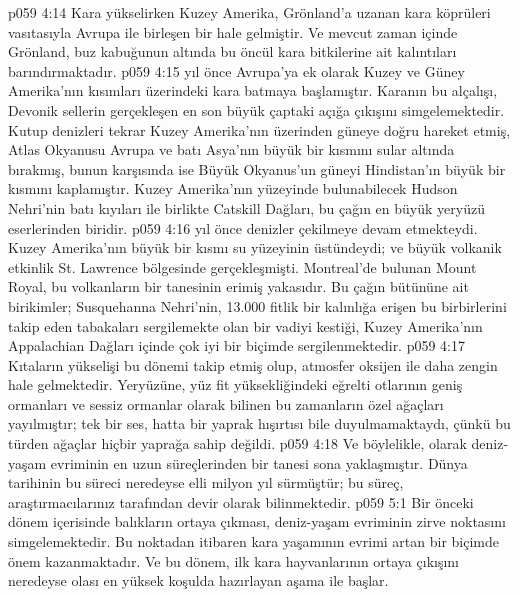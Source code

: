 \vs p059 4:14 Kara yükselirken Kuzey Amerika, Grönland’a uzanan kara köprüleri vasıtasıyla Avrupa ile birleşen bir hale gelmiştir. Ve mevcut zaman içinde Grönland, buz kabuğunun altında bu öncül kara bitkilerine ait kalıntıları barındırmaktadır.
\vs p059 4:15  yıl önce Avrupa’ya ek olarak Kuzey ve Güney Amerika’nın kısımları üzerindeki kara batmaya başlamıştır. Karanın bu alçalışı, Devonik sellerin gerçekleşen en son büyük çaptaki açığa çıkışını simgelemektedir. Kutup denizleri tekrar Kuzey Amerika’nın üzerinden güneye doğru hareket etmiş, Atlas Okyanusu Avrupa ve batı Asya’nın büyük bir kısmını sular altında bırakmış, bunun karşısında ise Büyük Okyanus’un güneyi Hindistan’ın büyük bir kısmını kaplamıştır. Kuzey Amerika’nın yüzeyinde bulunabilecek Hudson Nehri’nin batı kıyıları ile birlikte Catskill Dağları, bu çağın en büyük yeryüzü eserlerinden biridir.
\vs p059 4:16  yıl önce denizler çekilmeye devam etmekteydi. Kuzey Amerika’nın büyük bir kısmı su yüzeyinin üstündeydi; ve büyük volkanik etkinlik St. Lawrence bölgesinde gerçekleşmişti. Montreal’de bulunan Mount Royal, bu volkanların bir tanesinin erimiş yakasıdır. Bu çağın bütününe ait birikimler; Susquehanna Nehri’nin, 13.000 fitlik bir kalınlığa erişen bu birbirlerini takip eden tabakaları sergilemekte olan bir vadiyi kestiği, Kuzey Amerika’nın Appalachian Dağları içinde çok iyi bir biçimde sergilenmektedir.
\vs p059 4:17 Kıtaların yükselişi bu dönemi takip etmiş olup, atmosfer oksijen ile daha zengin hale gelmektedir. Yeryüzüne, yüz fit yüksekliğindeki eğrelti otlarının geniş ormanları ve sessiz ormanlar olarak bilinen bu zamanların özel ağaçları yayılmıştır; tek bir ses, hatta bir yaprak hışırtısı bile duyulmamaktaydı, çünkü bu türden ağaçlar hiçbir yaprağa sahip değildi.
\vs p059 4:18 Ve böylelikle,  olarak deniz\hyp{}yaşam evriminin en uzun süreçlerinden bir tanesi sona yaklaşmıştır. Dünya tarihinin bu süreci neredeyse elli milyon yıl sürmüştür; bu süreç, araştırmacılarınız tarafından  devir olarak bilinmektedir.
\vs p059 5:1 Bir önceki dönem içerisinde balıkların ortaya çıkması, deniz\hyp{}yaşam evriminin zirve noktasını simgelemektedir. Bu noktadan itibaren kara yaşamının evrimi artan bir biçimde önem kazanmaktadır. Ve bu dönem, ilk kara hayvanlarının ortaya çıkışını neredeyse olası en yüksek koşulda hazırlayan aşama ile başlar.
